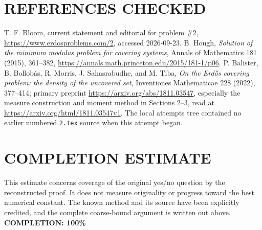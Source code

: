 \section{REFERENCES CHECKED}
T. F. Bloom, current statement and editorial for problem \#2, \url{https://www.erdosproblems.com/2}, accessed 2026-09-23. B. Hough, \emph{Solution of the minimum modulus problem for covering systems}, Annals of Mathematics 181 (2015), 361--382, \url{https://annals.math.princeton.edu/2015/181-1/p06}. P. Balister, B. Bollob\'as, R. Morris, J. Sahasrabudhe, and M. Tiba, \emph{On the Erd\H{o}s covering problem: the density of the uncovered set}, Inventiones Mathematicae 228 (2022), 377--414; primary preprint \url{https://arxiv.org/abs/1811.03547}, especially the measure construction and moment method in Sections 2--3, read at \url{https://arxiv.org/html/1811.03547v1}. The local attempts tree contained no earlier numbered \texttt{2.tex} source when this attempt began.

\section{COMPLETION ESTIMATE}
This estimate concerns coverage of the original yes/no question by the reconstructed proof. It does not measure originality or progress toward the best numerical constant. The known method and its source have been explicitly credited, and the complete coarse-bound argument is written out above.
\textbf{COMPLETION: 100\%}
